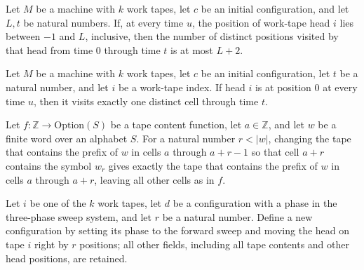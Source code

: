 \begin{lemma}
\label{Turing.catalog_space_bound}
\leanok
{}
Let $M$ be a machine with $k$ work tapes, let $c$ be an initial configuration, and let
$L,t$ be natural numbers. If, at every time $u$, the position of work-tape head $i$ lies
between $-1$ and $L$, inclusive, then the number of distinct positions visited by that
head from time $0$ through time $t$ is at most $L+2$.
\end{lemma}

\begin{lemma}
\label{Turing.catalog_space_one}
\leanok
{}
Let $M$ be a machine with $k$ work tapes, let $c$ be an initial configuration, let $t$
be a natural number, and let $i$ be a work-tape index. If head $i$ is at position $0$ at
every time $u$, then it visits exactly one distinct cell through time $t$.
\end{lemma}

\begin{theorem}
\label{Turing.catalog_write_take}
\leanok
{}
Let $f\colon\mathbb{Z}\to\mathrm{Option}(S)$ be a tape content function, let
$a\in\mathbb{Z}$, and let $w$ be a finite word over an alphabet $S$. For a natural
number $r<|w|$, changing the tape that contains the prefix of $w$ in cells $a$ through
$a+r-1$ so that cell $a+r$ contains the symbol $w_r$ gives exactly the tape that
contains the prefix of $w$ in cells $a$ through $a+r$, leaving all other cells as in
$f$.
\end{theorem}

\begin{definition}
\label{Turing.catalogClearF}
\leanok
{}
Let $i$ be one of the $k$ work tapes, let $d$ be a configuration with a phase in the
three-phase sweep system, and let $r$ be a natural number. Define a new configuration by
setting its phase to the forward sweep and moving the head on tape $i$ right by $r$
positions; all other fields, including all tape contents and other head positions, are
retained.
\end{definition}

